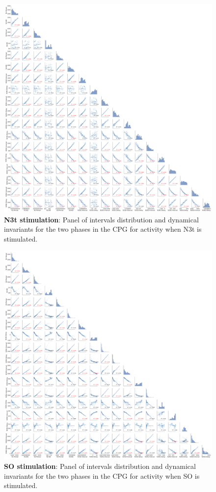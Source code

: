 \begin{figure}[htbp]
	\centering
	\includegraphics[width=\textwidth]{./invariants/data/MODEL/n3t_driven/images/3phases/output_pairplot.pdf}
	\caption{\textbf{N3t stimulation}: Panel of intervals distribution and dynamical invariants for the two phases in the CPG for activity when N3t is stimulated.}
	\label{fig:model n3t stimulation pairplot}
\end{figure}

\begin{figure}[htbp]
	\centering
	\includegraphics[width=\textwidth]{./invariants/data/MODEL/so_driven/images/3phases/output_pairplot.pdf}
	\caption{\textbf{SO stimulation}: Panel of intervals distribution and dynamical invariants for the two phases in the CPG for activity when SO is stimulated.}
	\label{fig:model so stimulation pairplot}
\end{figure}

